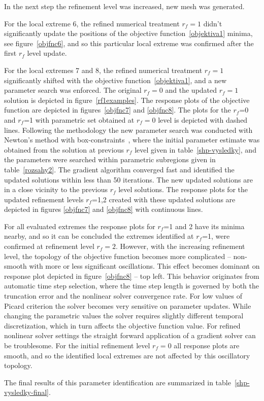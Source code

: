 \documentclass[review,times,3p,10pt]{elsarticle}
\begin{document}
In the next step the refinement level was increased, new mesh was generated.

For the local extreme 6, the refined numerical treatment $r_f=1$ 
{didn't significantly update  the positions of the objective function~\eqref{objektiva1} minima, see figure~\ref{objfnc6}, and so this particular local extreme was confirmed after the first $r_f$ level update. }

 

{For the local extremes 7 and 8, the refined numerical treatment $r_f=1$  significantly shifted with the objective function~\eqref{objektiva1}, and a new parameter search was enforced. The original $r_f=0$ and the updated $r_f=1$ solution is depicted in figure~\ref{rf1examples}. The response plots of the objective function are depicted in figures~\ref{objfnc7} and \ref{objfnc8}.  The plots for the $r_f$=0 and $r_f$=1 with parametric set obtained at $r_f=0$ level is depicted with dashed lines. Following the methodology the new parameter search was conducted with 
Newton's method with box-constraints~\citep{byrd1995}, where the initial parameter estimate was obtained from the solution at previous $r_f$ level given in table~\ref{shp-vysledky}, and the parameters were searched within parametric subregions given in table~\ref{rozsahy2}. 
The gradient algorithm converged fast and identified the updated solutions within less than 50 iterations. The new updated solutions are in a close vicinity to the previous $r_f$ level solutions.
The response plots for the updated refinement levels $r_f$=1,2 created with these  updated solutions are depicted in figures  \ref{objfnc7} and \ref{objfnc8} with continuous lines. 

For all evaluated extremes the response plots for $r_f$=1 and 2 have its minima nearby, and so it can be concluded the extremes identified at $r_f$=1, were confirmed at refinement level $r_f=2$. However, with the increasing refinement level, the topology of the objective function becomes more complicated -- non-smooth with more or less significant oscillations. This effect becomes dominant on response plot depicted in figure~\ref{objfnc8} -- top left. This behavior originates from automatic time step selection, where the time step length is governed by both the truncation error and the nonlinear solver convergence rate. For low values of Picard criterion the solver becomes very sensitive on parameter updates. While  changing the parametric values the solver requires slightly different temporal discretization, which in turn affects the objective function value. For refined nonlinear solver settings the straight forward application of a gradient solver can be troublesome.  For the initial refinement level $r_f=0$ all response plots are smooth, and so the identified local extremes are not affected by this oscillatory topology.

The final results of this parameter identification are summarized in table~\ref{shp-vysledky-final}.
}
\end{document}
